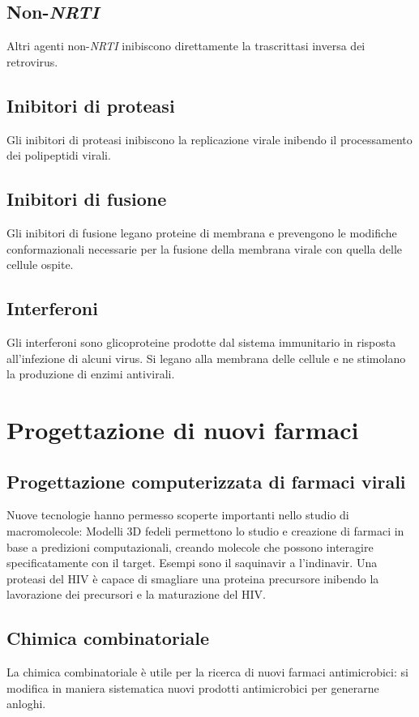 	\subsection{Non-\emph{NRTI}}
	Altri agenti non-\emph{NRTI} inibiscono direttamente la trascrittasi inversa dei retrovirus.

	\subsection{Inibitori di proteasi}
	Gli inibitori di proteasi inibiscono la replicazione virale inibendo il processamento dei polipeptidi virali.

	\subsection{Inibitori di fusione}
	Gli inibitori di fusione legano proteine di membrana e prevengono le modifiche conformazionali necessarie per la fusione della membrana virale con quella delle cellule ospite.

	\subsection{Interferoni}
	Gli interferoni sono glicoproteine prodotte dal sistema immunitario in risposta all'infezione di alcuni virus.
	Si legano alla membrana delle cellule e ne stimolano la produzione di enzimi antivirali.


\section{Progettazione di nuovi farmaci}

	\subsection{Progettazione computerizzata di farmaci virali}
	Nuove tecnologie hanno permesso scoperte importanti nello studio di macromolecole:
	Modelli 3D fedeli permettono lo studio e creazione di farmaci in base a predizioni computazionali, creando molecole che possono interagire specificatamente con il target.
	Esempi sono il saquinavir a l'indinavir.
	Una proteasi del HIV \`e capace di smagliare una proteina precursore inibendo la lavorazione dei precursori e la maturazione del HIV.

	\subsection{Chimica combinatoriale}
	La chimica combinatoriale \`e utile per la ricerca di nuovi farmaci antimicrobici: si modifica in maniera sistematica nuovi prodotti antimicrobici per generarne anloghi.
